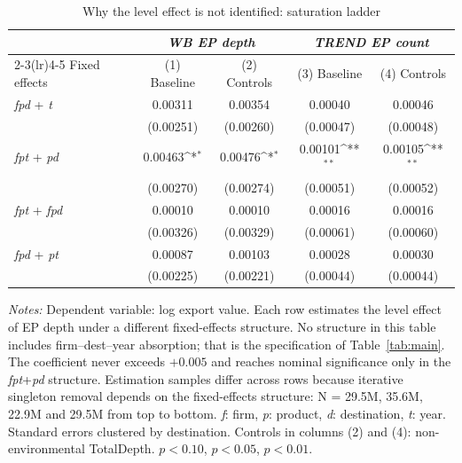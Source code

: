 \begin{table}[htbp]
\centering
\footnotesize
\caption{Why the level effect is not identified: saturation ladder}
\label{tab:ladder}
\begin{threeparttable}
{
\def\sym#1{\ifmmode^{#1}\else\(^{#1}\)\fi}
\begin{tabular}{lcccc}
\toprule
 & \multicolumn{2}{c}{\textit{WB EP depth}} & \multicolumn{2}{c}{\textit{TREND EP count}} \\
\cmidrule(lr){2-3}\cmidrule(lr){4-5}
Fixed effects & (1) Baseline & (2) Controls & (3) Baseline & (4) Controls \\
\midrule
\textit{fpd} + \textit{t} & 0.00311 & 0.00354 & 0.00040 & 0.00046 \\
 & (0.00251) & (0.00260) & (0.00047) & (0.00048) \\
\addlinespace
\textit{fpt} + \textit{pd} & 0.00463\sym{*} & 0.00476\sym{*} & 0.00101\sym{**} & 0.00105\sym{**} \\
 & (0.00270) & (0.00274) & (0.00051) & (0.00052) \\
\addlinespace
\textit{fpt} + \textit{fpd} & 0.00010 & 0.00010 & 0.00016 & 0.00016 \\
 & (0.00326) & (0.00329) & (0.00061) & (0.00060) \\
\addlinespace
\textit{fpd} + \textit{pt} & 0.00087 & 0.00103 & 0.00028 & 0.00030 \\
 & (0.00225) & (0.00221) & (0.00044) & (0.00044) \\
\bottomrule
\end{tabular}
}
\begin{tablenotes}[flushleft]\footnotesize
\item \emph{Notes:} Dependent variable: log export value. Each row estimates the level effect of EP depth under a different fixed-effects structure. No structure in this table includes firm--dest--year absorption; that is the specification of Table~\ref{tab:main}. The coefficient never exceeds $+0.005$ and reaches nominal significance only in the \textit{fpt}+\textit{pd} structure. Estimation samples differ across rows because iterative singleton removal depends on the fixed-effects structure: N = 29.5M, 35.6M, 22.9M and 29.5M from top to bottom. \textit{f}: firm, \textit{p}: product, \textit{d}: destination, \textit{t}: year. Standard errors clustered by destination. Controls in columns (2) and (4): non-environmental TotalDepth. \sym{*} $p<0.10$, \sym{**} $p<0.05$, \sym{***} $p<0.01$.
\end{tablenotes}
\end{threeparttable}
\end{table}
